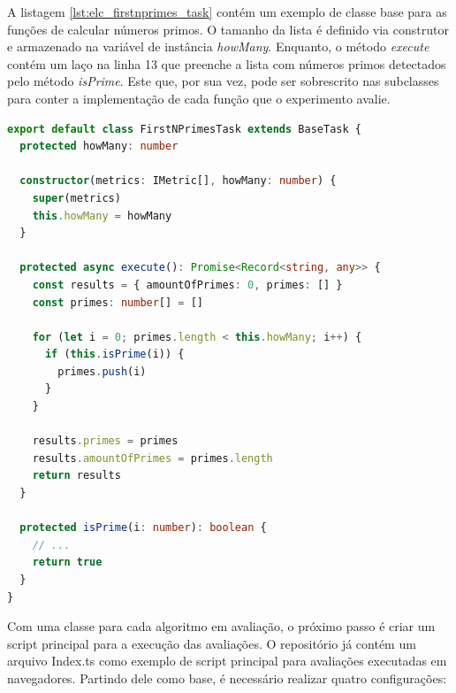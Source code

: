 \documentclass[12pt]{tcc}
\begin{document}
	A listagem \ref{lst:elc_firstnprimes_task} contém um exemplo de classe base para as funções de calcular números primos.
	O tamanho da lista é definido via construtor e armazenado na variável de instância \emph{howMany}.
	Enquanto, o método \emph{execute} contém um laço na linha 13 que preenche a lista com números primos detectados pelo método \emph{isPrime}.
	Este que, por sua vez, pode ser sobrescrito nas subclasses para conter a implementação de cada função que o experimento avalie.

\begin{lstlisting}[label={lst:elc_firstnprimes_task}, caption={[Exemplo de implementação de algoritmo que calcula números primos]Exemplo de classe encapsulando um algoritmo de cálculo de números primos.}, language=TypeScript, breaklines=true]
export default class FirstNPrimesTask extends BaseTask {
  protected howMany: number

  constructor(metrics: IMetric[], howMany: number) {
    super(metrics)
    this.howMany = howMany
  }

  protected async execute(): Promise<Record<string, any>> {
    const results = { amountOfPrimes: 0, primes: [] }
    const primes: number[] = []

    for (let i = 0; primes.length < this.howMany; i++) {
      if (this.isPrime(i)) {
        primes.push(i)
      }
    }

    results.primes = primes
    results.amountOfPrimes = primes.length
    return results
  }

  protected isPrime(i: number): boolean {
    // ...
    return true
  }
}
\end{lstlisting}

	Com uma classe para cada algoritmo em avaliação, o próximo passo é criar um script principal para a execução das avaliações.
	O repositório já contém um arquivo Index.ts como exemplo de script principal para avaliações executadas em navegadores.
	Partindo dele como base, é necessário realizar quatro configurações:
\end{document}
